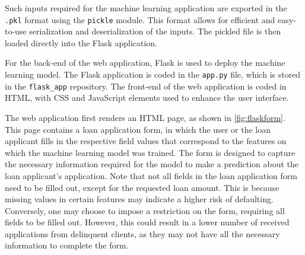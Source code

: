         Such inputs required for the machine learning application are exported in the \lstinline{.pkl} format using the \lstinline{pickle} module. This format allows for efficient and easy-to-use serialization and deserialization of the inputs. The pickled file is then loaded directly into the Flask application.
        
        For the back-end of the web application, Flask is used to deploy the machine learning model. The Flask application is coded in the \lstinline{app.py} file, which is stored in the \lstinline{flask_app} repository. The front-end of the web application is coded in HTML, with CSS and JavaScript elements used to enhance the user interface.
        
        The web application first renders an HTML page, as shown in \autoref{fig:flaskform}.
        This page contains a loan application form, in which the user or the loan applicant fills in the respective field values that correspond to the features on which the machine learning model was trained.
        The form is designed to capture the necessary information required for the model to make a prediction about the loan applicant's application.
        Note that not all fields in the loan application form need to be filled out, except for the requested loan amount. This is because missing values in certain features may indicate a higher risk of defaulting. Conversely, one may choose to impose a restriction on the form, requiring all fields to be filled out. However, this could result in a lower number of received applications from delinquent clients, as they may not have all the necessary information to complete the form.
        
